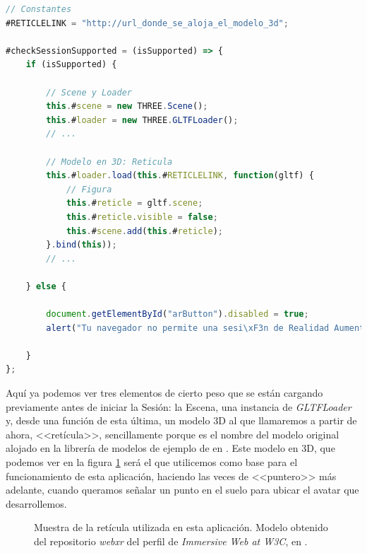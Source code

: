 \documentclass{subfiles}
\begin{document}
\begin{lstlisting}[language=JavaScript, caption={Carga de elementos de Three.js si se soporta la sesión.}, label={lst:3.1}]
// Constantes
#RETICLELINK = "http://url_donde_se_aloja_el_modelo_3d";

#checkSessionSupported = (isSupported) => {
    if (isSupported) {
    
        // Scene y Loader
        this.#scene = new THREE.Scene();
        this.#loader = new THREE.GLTFLoader();
        // ...

        // Modelo en 3D: Reticula
        this.#loader.load(this.#RETICLELINK, function(gltf) {
            // Figura
            this.#reticle = gltf.scene;
            this.#reticle.visible = false;
            this.#scene.add(this.#reticle);
        }.bind(this));
        // ...
    
    } else {
    
        document.getElementById("arButton").disabled = true;
        alert("Tu navegador no permite una sesi\xF3n de Realidad Aumentada.");
        
    }
};
\end{lstlisting}

        Aquí ya podemos ver tres elementos de cierto peso que se están cargando previamente antes de iniciar la Sesión: la Escena, una instancia de \textit{GLTFLoader} y, desde una función de esta última, un modelo 3D al que llamaremos a partir de ahora, <<retícula>>, sencillamente porque es el nombre del modelo original alojado en la librería de modelos de ejemplo de \webxr en \github. Este modelo en 3D, que podemos ver en la figura \ref{fig:reticle} será el que utilicemos como base para el funcionamiento de esta aplicación, haciendo las veces de <<puntero>> más adelante, cuando queramos señalar un punto en el suelo para ubicar el avatar que desarrollemos.

        \begin{figure}
        \centering
        \caption[Muestra de la retícula utilizada en esta aplicación.]{Muestra de la retícula utilizada en esta aplicación. Modelo obtenido del repositorio \textit{webxr} del perfil de \textit{Immersive Web at W3C}, en \github.}
        \label{fig:reticle}
        \end{figure}
\end{document}
